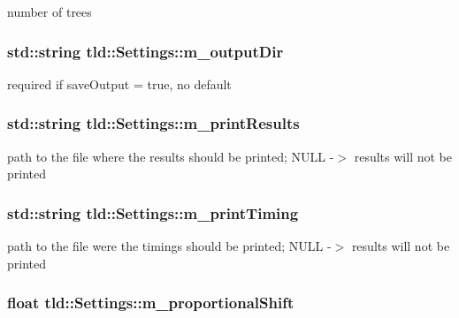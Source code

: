 number of trees 

\hypertarget{classtld_1_1Settings_a8893600d99c4d096e384e4aeff2155f7}{
\subsubsection[{m\-\_\-output\-Dir}]{\setlength{\rightskip}{0pt plus 5cm}std\-::string tld\-::\-Settings\-::m\-\_\-output\-Dir}}\label{classtld_1_1Settings_a8893600d99c4d096e384e4aeff2155f7}


required if save\-Output = true, no default 

\hypertarget{classtld_1_1Settings_a214e9008680cab432e095e5d07372dd1}{
\subsubsection[{m\-\_\-print\-Results}]{\setlength{\rightskip}{0pt plus 5cm}std\-::string tld\-::\-Settings\-::m\-\_\-print\-Results}}\label{classtld_1_1Settings_a214e9008680cab432e095e5d07372dd1}


path to the file where the results should be printed; N\-U\-L\-L -\/$>$ results will not be printed 

\hypertarget{classtld_1_1Settings_af986bcadbc3f34693dd13191bbf65947}{
\subsubsection[{m\-\_\-print\-Timing}]{\setlength{\rightskip}{0pt plus 5cm}std\-::string tld\-::\-Settings\-::m\-\_\-print\-Timing}}\label{classtld_1_1Settings_af986bcadbc3f34693dd13191bbf65947}


path to the file were the timings should be printed; N\-U\-L\-L -\/$>$ results will not be printed 

\hypertarget{classtld_1_1Settings_afcb52ecca38e4e236a66c3f36ec7cdbf}{
\subsubsection[{m\-\_\-proportional\-Shift}]{\setlength{\rightskip}{0pt plus 5cm}float tld\-::\-Settings\-::m\-\_\-proportional\-Shift}}\label{classtld_1_1Settings_afcb52ecca38e4e236a66c3f36ec7cdbf}


